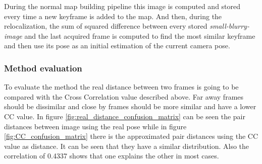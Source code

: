 During the normal map building pipeline this image is computed and stored every time a new keyframe is added to the map. And then, during the relocalization, the sum of squared difference between every stored \textit{small-blurry-image} and the last acquired frame is computed to find the most similar keyframe and then use its pose as an initial estimation of the current camera pose.\\

\subsubsection{Method evaluation}
\label{ssub:method_evaluation}

To evaluate the method the real distance between two frames is going to be compared with the Cross Correlation value described above. Far away frames should be dissimilar and close by frames should be more similar and have a lower CC value. In figure \ref{fig:real_distance_confusion_matrix} can be seen the pair distances between image using the real pose while in figure \ref{fig:CC_confusion_matrix} there is the approximated pair distances using the CC value as distance. It can be seen that they have a similar distribution. Also the correlation of 0.4337 shows that one explains the other in most cases.\\

